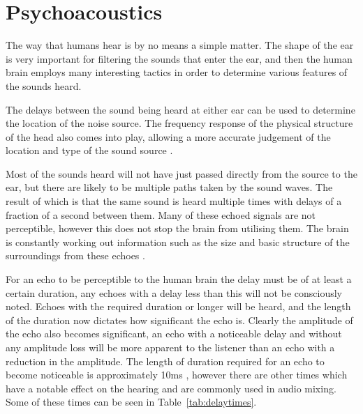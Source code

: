 \section{Psychoacoustics}
The way that humans hear is by no means a simple matter.
The shape of the ear is very important for filtering the sounds that enter the ear, and then the human brain employs many interesting tactics in order to determine various features of the sounds heard.

The delays between the sound being heard at either ear can be used to determine the location of the noise source.
The frequency response of the physical structure of the head also comes into play, allowing a more accurate judgement of the location and type of the sound source \cite{CogPsychMus}.

Most of the sounds heard will not have just passed directly from the source to the ear, but there are likely to be multiple paths taken by the sound waves.
The result of which is that the same sound is heard multiple times with delays of a fraction of a second between them.
Many of these echoed signals are not perceptible, however this does not stop the brain from utilising them.
The brain is constantly working out information such as the size and basic structure of the surroundings from these echoes \cite{CogPsychMus}.

For an echo to be perceptible to the human brain the delay must be of at least a certain duration, any echoes with a delay less than this will not be consciously noted.
Echoes with the required duration or longer will be heard, and the length of the duration now dictates how significant the echo is.
Clearly the amplitude of the echo also becomes significant, an echo with a noticeable delay and without any amplitude loss will be more apparent to the listener than an echo with a reduction in the amplitude.
The length of duration required for an echo to become noticeable is approximately 10ms \cite{TimeSpaceHearing}, however there are other times which have a notable effect on the hearing and are commonly used in audio mixing.
Some of these times can be seen in Table~\ref{tab:delaytimes}.

